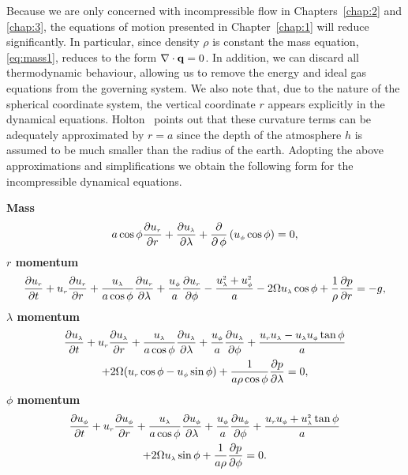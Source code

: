 Because we are only concerned with incompressible flow in Chapters~\ref{chap:2} and \ref{chap:3}, the equations of motion presented in Chapter~\ref{chap:1} will reduce significantly. In particular, since density $\rho$ is constant the mass equation, \eqref{eq:mass1}, reduces to the form $\nabla\cdot\bol{q}=0$. In addition, we can discard all thermodynamic behaviour, allowing us to remove the energy and ideal gas equations from the governing system. We also note that, due to the nature of the spherical coordinate system, the vertical coordinate $r$ appears explicitly in the dynamical equations. Holton~\cite[page 24]{Holton:IDM} points out that these curvature terms can be adequately approximated by $r=a$ since the depth of the atmosphere $h$ is assumed to be much smaller than the radius of the earth. Adopting the above approximations and simplifications we obtain the following form for the incompressible dynamical equations.

{\bfseries Mass}
\begin{equation}
a\cos\phi\durd{r}+\dulamd{\lambda}+\frac{\partial}{\partial \, \phi} \left(\uphi\cos\phi \right)= 0, \label{eq:incompmass}
\end{equation}
{\bfseries \boldmath$r$ momentum}
\begin{equation}
\durd{t} +\ur\durd{r}+ \frac{\ulam}{a\cos\phi}\durd{\lambda}+\frac{\uphi}{a}\durd{\phi}-\frac{\ulams+\uphis}{a}-2\Omega\ulam\cos\phi+\frac{1}{\rho}\dpd{r}= -g, \label{eq:incompr}
\end{equation}
{\bfseries \boldmath$\lambda$ momentum}
\begin{multline}
\dulamd{t} +\ur\dulamd{r}+ \frac{\ulam}{a\cos\phi}\dulamd{\lambda}+\frac{\uphi}{a}\dulamd{\phi}+\frac{\ur\ulam-\ulam\uphi\tan\phi}{a}\\+2\Omega(\ur\cos\phi-\uphi\sin\phi)+\frac{1}{a\rho\cos\phi}\dpd{\lambda}= 0, \label{eq:incomplam}
\end{multline}
{\bfseries \boldmath$\phi$ momentum}
\begin{multline}
\duphid{t} +\ur\duphid{r}+ \frac{\ulam}{a\cos\phi}\duphid{\lambda}+\frac{\uphi}{a}\duphid{\phi}+\frac{\ur\uphi+\ulams\tan\phi}{a}\\+2\Omega\ulam\sin\phi+\frac{1}{a\rho}\dpd{\phi}= 0. \label{eq:incompphi}
\end{multline}

